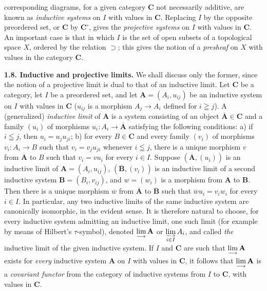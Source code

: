 
\noindent corresponding diagrams, for a given category $\mathbf{C}$ not necessarily
additive, are known as \textit{inductive systems} on $I$ with values in $\mathbf{C}$.
Replacing $I$ by the opposite preordered set, or $\mathbf{C}$ by $\mathbf{C}^\circ$, gives the
\textit{projective systems} on $I$ with values in $\mathbf{C}$. An important case is
that in which $I$ is the set of open subsets of a topological space $X$,
ordered by the relation $\supset$; this gives the notion of a
\textit{presheaf} on $X$ with values in the category $\mathbf{C}$.

\textbf{1.8. Inductive and projective limits.} We shall discuss only
the former, since the notion of a projective limit is dual to that of an
inductive limit. Let $\mathbf{C}$ be a category, let $I$ be a preordered set, and let
$\mathbf A=(A_i,u_{ij})$ be an inductive system on $I$ with values in $\mathbf{C}$
($u_{ij}$ is a morphism $A_j\to A_i$ defined for $i\geqq j$).
A (generalized) \textit{inductive limit} of $\mathbf A$ is a system consisting
of an object $\overline{\mathbf A}\in \mathbf{C}$ and a family $(u_i)$ of morphisms
$u_i:A_i\to\overline{\mathbf A}$ satisfying the following conditions:
a) if $i\leqq j$, then $u_i=u_j u_{ji}$; b) for every $B\in \mathbf{C}$ and every family
$(v_i)$ of morphisms $v_i:A_i\to B$ such that
$v_i=v_j u_{ji}$ whenever $i\leqq j$, there is a unique morphism $v$ from
$\overline{\mathbf A}$ to $B$ such that $v_i=v u_i$ for every $i\in I$.
Suppose $(\overline{\mathbf A},(u_i))$ is an inductive limit of
$\mathbf A=(A_i,u_{ij})$, $(\overline{\mathbf B},(v_i))$ is an inductive limit of a
second inductive system $\mathbf B=(B_i,v_{ij})$, and $w=(w_i)$ is a morphism
from $\mathbf A$ to $\mathbf B$. Then there is a unique morphism
$\overline w$ from $\overline{\mathbf A}$ to $\overline{\mathbf B}$ such that
$\overline w u_i=v_iw_i$ for every $i\in I$. In particular, any two inductive
limits of the same inductive system are canonically isomorphic, in the evident
sense. It is therefore natural to choose, for every inductive system admitting
an inductive limit, one such limit (for example by means of Hilbert's
$\tau$-symbol), denoted
$\mathop{\rm lim}\limits_{\longrightarrow}\mathbf A$ or
$\mathop{\rm lim}\limits_{\substack{\longrightarrow\\i\in I}}A_i$, and
called \textit{the} inductive limit of the given inductive system.
If $I$ and $\mathbf{C}$ are such that
$\mathop{\rm lim}\limits_{\longrightarrow}\mathbf A$ exists for
\textit{every} inductive system $\mathbf A$ on $I$ with values in $\mathbf{C}$, it
follows that $\mathop{\rm lim}\limits_{\longrightarrow}\mathbf A$ is a
\textit{covariant functor} from the category of inductive systems from $I$ to
$\mathbf{C}$, with values in $\mathbf{C}$.

